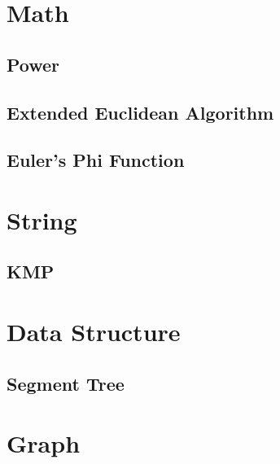\documentclass[10pt, a4paper]{article}
\begin{document}
\tableofcontents



\section{Math}

\subsection{Power}


\subsection{Extended Euclidean Algorithm}


\subsection{Euler's Phi Function}




\section{String}

\subsection{KMP}




\section{Data Structure}

\subsection{Segment Tree}




\section{Graph}
\end{document}
